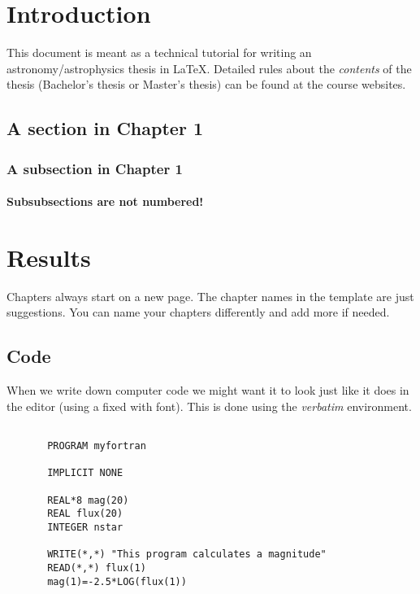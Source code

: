\documentclass[12pt]{report}
\begin{document}
\thispagestyle{empty}
\mbox{} %

\newpage

\setcounter{page}{1} %

\tableofcontents

\newpage

\listoffigures 
\listoftables

\newpage

\chapter{Introduction}

This document is meant as a technical tutorial for writing an
astronomy/astrophysics thesis in LaTeX. Detailed rules about the {\it contents}
of the thesis (Bachelor's thesis or Master's thesis) can be found at the course
websites.

\section{A section in Chapter 1}

\subsection{A subsection in Chapter 1}

\subsubsection{Subsubsections are not numbered!}

\chapter{Results}

Chapters always start on a new page. The chapter names in the template are just
suggestions. You can name your chapters differently and add more if needed.

\section{Code}

When we write down computer code we might want it to look just like it does in
the editor (using a fixed with font). This is done using the {\sl verbatim}
environment.

\begin{verbatim}

       PROGRAM myfortran

       IMPLICIT NONE

       REAL*8 mag(20)
       REAL flux(20)
       INTEGER nstar

       WRITE(*,*) "This program calculates a magnitude"
       READ(*,*) flux(1)
       mag(1)=-2.5*LOG(flux(1))

\end{verbatim}
\end{document}
